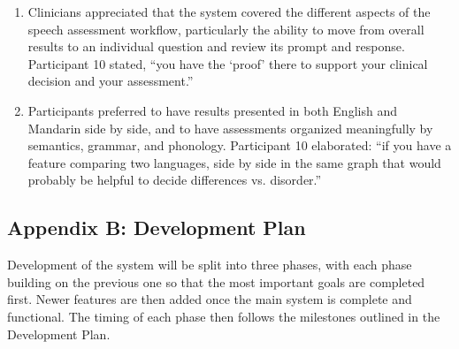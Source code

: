 \documentclass[12pt]{article}
\begin{document}
{\begin{enumerate}
  \item \label{AppA_P10Proof} Clinicians appreciated that the system covered the different aspects of the speech assessment workflow, particularly the ability to move from overall results to an individual question and review its prompt and response. Participant 10 stated, “you have the ‘proof’ there to support your clinical decision and your assessment.”
  \item \label{AppA_P10Languages} Participants preferred to have results presented in both English and Mandarin side by side, and to have assessments organized meaningfully by semantics, grammar, and phonology. Participant 10 elaborated: “if you have a feature comparing two languages, side by side in the same graph that would probably be helpful to decide differences vs. disorder.”
\end{enumerate}}


\subsection{Appendix B: Development Plan} \label{sec:AppendixB}

Development of the system will be split into three phases, with each phase 
building on the previous one so that the most important goals are completed first.
Newer features are then added once the main system is complete and functional. 
The timing of each phase then follows the milestones outlined in the Development Plan.
\end{document}
